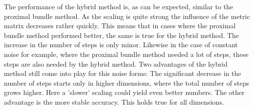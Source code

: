The performance of the hybrid method is, as can be expected, similar to the proximal bundle method. As the scaling is quite strong the influence of the metric matrix decreases rather quickly.
This means that in cases where the proximal bundle method performed better, the same is true for the hybrid method. The increase in the number of steps is only minor. Likewise in the case of constant noise for example, where the proximal bundle method needed a lot of steps, these steps are also needed by the hybrid method. Two advantages of the hybrid method still come into play for this noise forms: The significant decrease in the number of steps starts only in higher dimensions, where the total number of steps grows higher. Here a 'slower' scaling could yield even better numbers.
The other advantage is the more stable accuracy. This holds true for all dimensions.
%
%
%
